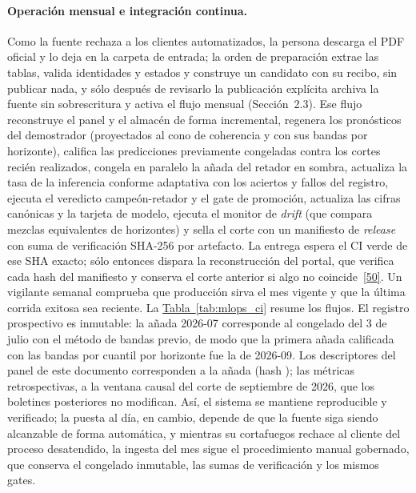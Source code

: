 \documentclass[12pt,letterpaper]{report}
\newcommand{\cita}[1]{\hyperref[bib:#1]{[#1]}}
\begin{document}
\paragraph{Operación mensual e integración continua.} Como la fuente rechaza a los clientes
automatizados, la persona descarga el PDF oficial y lo deja en la carpeta de entrada; la orden de
preparación extrae las tablas, valida identidades y estados y construye un candidato con su
recibo, sin publicar nada, y sólo después de revisarlo la publicación explícita archiva la fuente
sin sobrescritura y activa el flujo mensual (Secci\'on~2.3). Ese flujo reconstruye el panel y el
almac\'en de forma incremental, regenera los pron\'osticos del demostrador (proyectados al cono de
coherencia y con sus bandas por horizonte), califica las predicciones previamente congeladas contra
los cortes reci\'en realizados, congela en paralelo la a\~nada del retador en sombra, actualiza la
tasa de la inferencia conforme adaptativa con los aciertos y fallos del registro, ejecuta el
veredicto campe\'on-retador y el gate de promoción, actualiza las cifras canónicas y la tarjeta de
modelo, ejecuta el monitor de \textit{drift} (que compara mezclas equivalentes de horizontes) y
sella el corte con un manifiesto de \textit{release} con suma de verificaci\'on SHA-256 por
artefacto. La entrega espera el CI verde de ese SHA exacto; sólo entonces dispara la
reconstrucción del portal, que verifica cada hash del manifiesto y conserva el corte anterior si
algo no coincide~\cita{50}. Un vigilante semanal comprueba que producción sirva el mes vigente y
que la última corrida exitosa sea reciente. La \hyperref[tab:mlops_ci]{Tabla~\ref*{tab:mlops_ci}} resume los flujos. El
registro prospectivo es inmutable: la a\~nada 2026-07 corresponde al congelado del 3 de julio con
el m\'etodo de bandas previo, de modo que la primera a\~nada calificada con las bandas por cuantil
por horizonte fue la de 2026-09. Los descriptores del panel de este documento corresponden a la
a\~nada \factPanelVintage{} (hash \factPanelHashShort); las m\'etricas retrospectivas, a la
ventana causal del corte de septiembre de 2026, que los boletines posteriores no modifican. As\'i,
el sistema se mantiene reproducible y verificado; la puesta al d\'ia, en cambio, depende de que la
fuente siga siendo alcanzable de forma autom\'atica, y mientras su cortafuegos rechace al cliente
del proceso desatendido, la ingesta del mes sigue el procedimiento manual gobernado, que conserva
el congelado inmutable, las sumas de verificaci\'on y los mismos gates.
\end{document}
